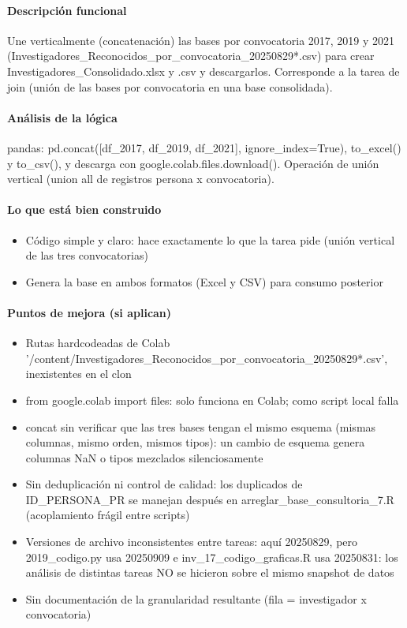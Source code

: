\paragraph{Descripción funcional}
Une verticalmente (concatenación) las bases por convocatoria 2017, 2019 y 2021 (Investigadores\_Reconocidos\_por\_convocatoria\_20250829*.csv) para crear Investigadores\_Consolidado.xlsx y .csv y descargarlos. Corresponde a la tarea de join (unión de las bases por convocatoria en una base consolidada).

\paragraph{Análisis de la lógica}
pandas: pd.concat([df\_2017, df\_2019, df\_2021], ignore\_index=True), to\_excel() y to\_csv(), y descarga con google.colab.files.download(). Operación de unión vertical (union all de registros persona x convocatoria).

\paragraph{Lo que está bien construido}
\begin{itemize}
  \item Código simple y claro: hace exactamente lo que la tarea pide (unión vertical de las tres convocatorias)
  \item Genera la base en ambos formatos (Excel y CSV) para consumo posterior
\end{itemize}

\paragraph{Puntos de mejora (si aplican)}
\begin{itemize}
  \item Rutas hardcodeadas de Colab '/content/Investigadores\_Reconocidos\_por\_convocatoria\_20250829*.csv', inexistentes en el clon
  \item from google.colab import files: solo funciona en Colab; como script local falla
  \item concat sin verificar que las tres bases tengan el mismo esquema (mismas columnas, mismo orden, mismos tipos): un cambio de esquema genera columnas NaN o tipos mezclados silenciosamente
  \item Sin deduplicación ni control de calidad: los duplicados de ID\_PERSONA\_PR se manejan después en arreglar\_base\_consultoria\_7.R (acoplamiento frágil entre scripts)
  \item Versiones de archivo inconsistentes entre tareas: aquí 20250829, pero 2019\_codigo.py usa 20250909 e inv\_17\_codigo\_graficas.R usa 20250831: los análisis de distintas tareas NO se hicieron sobre el mismo snapshot de datos
  \item Sin documentación de la granularidad resultante (fila = investigador x convocatoria)
\end{itemize}

